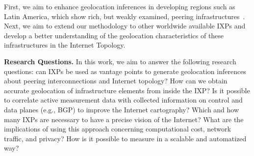 	First, we aim to enhance geolocation inferences in developing regions such as Latin America, which show rich, but weakly examined, peering infrastructures~\cite{IXbr, DissectingBrazilianIXP}. Next, we aim to extend our methodology to other worldwide available IXPs and develop a better understanding of the geolocation characteristics of these infrastructures in the Internet Topology.




	\textbf{Research Questions.} In this work, we aim to answer the following research questions: can IXPs be used as vantage points to generate geolocation inferences about peering interconnections and Internet topology? How can we obtain accurate geolocation of infrastructure elements from inside the IXP? Is it possible to correlate active measurement data with collected information on control and data planes (e.g., BGP) to improve the Internet cartography?  Which and how many IXPs are necessary to have a precise vision of the Internet? What are the implications of using this approach concerning computational cost, network traffic, and privacy? How is it possible to measure in a scalable and automatized way?

